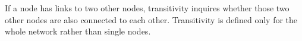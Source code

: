 \documentclass[12pt]{article}
\begin{document}
If a node has links to two other nodes, transitivity inquires whether those two other nodes are also connected to each other. Transitivity is defined only for the whole network rather than single nodes. 
%
%
%
%
%
%
%
%
%
%
%
%
%
%
%
%
%
%
%
%
%
%
%
%
\end{document}
